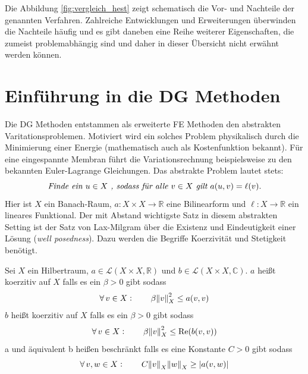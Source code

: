 Die Abbildung \ref{fig:vergleich_hest} zeigt schematisch die Vor- und Nachteile der genannten Verfahren. Zahlreiche Entwicklungen und Erweiterungen überwinden die Nachteile häufig und es gibt daneben eine Reihe weiterer Eigenschaften, die zumeist problemabhängig sind und daher in dieser Übersicht nicht erwähnt werden können.

\section{Einführung in die DG Methoden}
Die DG Methoden entstammen als erweiterte FE Methoden den abstrakten Varitationsproblemen. Motiviert wird ein solches Problem physikalisch durch die Minimierung einer Energie (mathematisch auch als Kostenfunktion bekannt). Für eine eingespannte Membran führt die Variationsrechnung beispielsweise zu den bekannten Euler-Lagrange Gleichungen. Das abstrakte Problem lautet stets:
\begin{equation}\label{varprob}
      \emph{Finde ein } u\in X\emph{ , sodass für alle } v\in X \emph{ gilt } a(u,v) = \ell(v).
\end{equation}
Hier ist $X$ ein Banach-Raum, $a:X\times X \rightarrow \mathbb{R}$ eine Bilinearform und ${\ell:X\rightarrow \mathbb{R}}$ ein lineares Funktional.
Der mit Abstand wichtigste Satz in diesem abstrakten Setting ist der Satz von Lax-Milgram \cite{buchPietro} über die Existenz und Eindeutigkeit einer Lösung (\emph{well posedness}). Dazu werden die Begriffe Koerzivität und Stetigkeit benötigt.
\begin{definition} \label{def:koerz}
  Sei $X$ ein Hilbertraum, $a \in \mathcal{L}(X\times X, \mathbb{R})$ und $b \in \mathcal{L}(X\times X, \mathbb{C})$. $a$ heißt koerzitiv auf $X$ falls es ein $\beta>0$ gibt sodass
  \begin{equation}
    \forall \, v \in X : \qquad \beta\norm{v}^2_X \leq a(v,v)
  \end{equation}
  $b$ heißt koerzitiv auf $X$ falls es ein $\beta>0$ gibt sodass
  \begin{equation}
    \forall \, v \in X : \qquad \beta\norm{v}^2_X \leq  \operatorname{Re}(b(v,v))   \label{eq:koerz_imag}
  \end{equation}
  a und äquivalent b heißen beschränkt falls es eine Konstante $C>0$ gibt sodass
  \begin{equation}
    \forall \, v,w \in X : \qquad C\norm{v}_X \norm{w}_X \geq |a(v,w)|
  \end{equation}
\end{definition}

